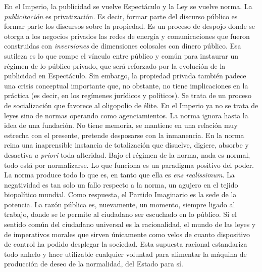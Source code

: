 En el Imperio, la publicidad se vuelve Espectáculo y la Ley se vuelve norma. La \emph{publicitación} es privatización. Es decir, formar parte del discurso público es formar parte los discursos sobre la propiedad. Es un proceso de despojo donde se otorga a los negocios privados las redes de energía y comunicaciones que fueron construidas con \emph{inversiones} de dimensiones colosales con dinero público. Esa sutileza es lo que rompe el vínculo entre público y común para instaurar un régimen de lo público-privado, que será reforzado por la evolución de la publicidad en Espectáculo. Sin embargo, la propiedad privada también padece una crisis conceptual importante que, no obstante, no tiene implicaciones en la práctica (es decir, en los regímenes jurídicos y políticos). Se trata de un proceso de socialización que favorece al oligopolio de élite. En el Imperio ya no se trata de leyes sino de normas operando como agenciamientos. La norma ignora hasta la idea de una fundación. No tiene memoria, se mantiene en una relación muy estrecha con el presente, pretende desposarse con la inmanencia. En la norma reina una inaprensible instancia de totalización que disuelve, digiere, absorbe y desactiva \emph{a priori} toda alteridad. Bajo el régimen de la norma, nada es normal, todo está por normalizarse. Lo que funciona es un paradigma positivo del poder. La norma produce todo lo que es, en tanto que ella es \emph{ens realissimum}. La negatividad es tan solo un fallo respecto a la norma, un agujero en el tejido biopolítico mundial. Como respuesta, el Partido Imaginario es la sede de la potencia. La razón pública es, nuevamente, un momento, siempre ligado al trabajo, donde se le permite al ciudadano ser escuchado en lo público. Si el sentido común del ciudadano universal es la racionalidad, el mundo de las leyes y de imperativos morales que sirven únicamente como velos de cuanto dispositivo de control ha podido desplegar la sociedad. Esta supuesta racional estandariza todo anhelo y hace utilizable cualquier voluntad para alimentar la máquina de producción de deseo de la normalidad, del Estado para sí.

